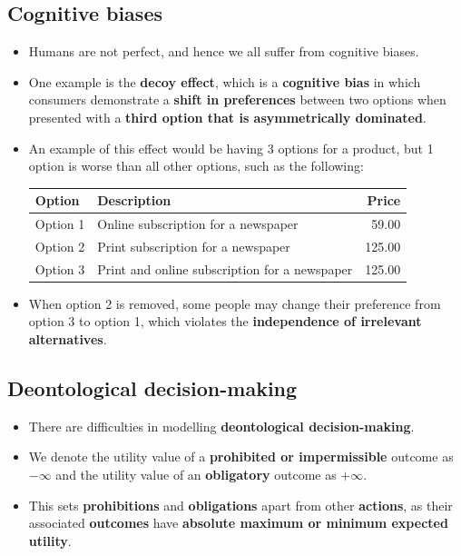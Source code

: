 \documentclass[11pt]{article}
\begin{document}
\subsection{Cognitive biases}
\label{sec:orgdea3e15}
\begin{itemize}
\item Humans are not perfect, and hence we all suffer from cognitive biases.
\item One example is the \textbf{decoy effect}, which is a \textbf{cognitive bias} in which consumers demonstrate a \textbf{shift in preferences} between two options when presented with a \textbf{third option that is asymmetrically dominated}.
\item An example of this effect would be having 3 options for a product, but 1 option is worse than all other options, such as the following:
\begin{center}
\begin{tabular}{l|l|r}
Option & Description & Price\\
\hline
Option 1 & Online subscription for a newspaper & 59.00\\
Option 2 & Print subscription for a newspaper & 125.00\\
Option 3 & Print and online subscription for a newspaper & 125.00\\
\end{tabular}
\end{center}

\item When option 2 is removed, some people may change their preference from option 3 to option 1, which violates the \textbf{independence of irrelevant alternatives}.
\end{itemize}
\subsection{Deontological decision-making}
\label{sec:org0809bbd}
\begin{itemize}
\item There are difficulties in modelling \textbf{deontological decision-making}.
\item We denote the utility value of a \textbf{prohibited or impermissible} outcome as \(-\infty\) and the utility value of an \textbf{obligatory} outcome as \(+\infty\).
\item This sets \textbf{prohibitions} and \textbf{obligations} apart from other \textbf{actions}, as their associated \textbf{outcomes} have \textbf{absolute maximum or minimum expected utility}.
\end{itemize}
\end{document}
